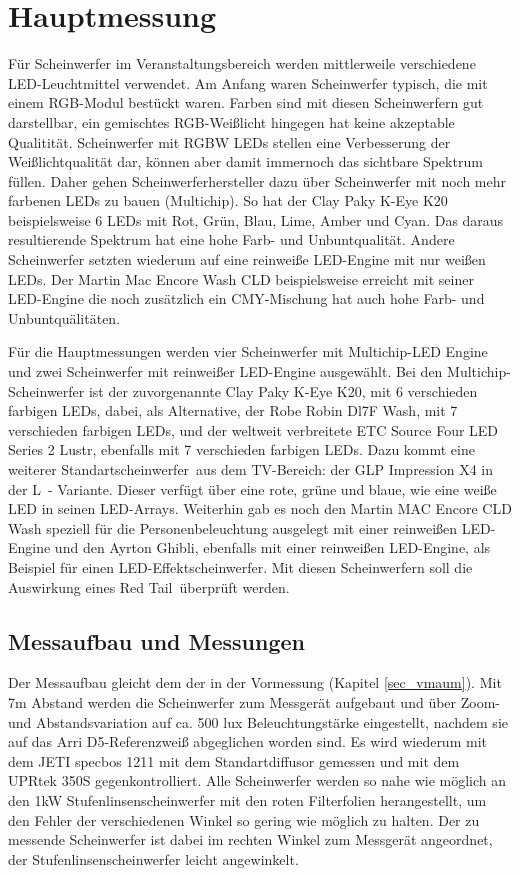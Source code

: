 \chapter{Hauptmessung}

Für Scheinwerfer im Veranstaltungsbereich werden mittlerweile verschiedene LED-Leuchtmittel verwendet. Am Anfang waren Scheinwerfer typisch, die mit einem RGB-Modul bestückt waren. Farben sind mit diesen Scheinwerfern gut darstellbar, ein gemischtes RGB-Weißlicht hingegen hat keine akzeptable Qualitität. Scheinwerfer mit RGBW LEDs stellen eine Verbesserung der Weißlichtqualität dar, können aber damit immernoch das sichtbare Spektrum füllen. Daher gehen Scheinwerferhersteller dazu über Scheinwerfer mit noch mehr farbenen LEDs zu bauen (Multichip). So hat der Clay Paky K-Eye K20 beispielsweise 6 LEDs mit Rot, Grün, Blau, Lime, Amber und Cyan. Das daraus resultierende Spektrum hat eine hohe Farb- und Unbuntqualität. Andere Scheinwerfer setzten wiederum auf eine reinweiße LED-Engine mit nur weißen LEDs. Der Martin Mac Encore Wash CLD beispielsweise erreicht mit seiner LED-Engine die noch zusätzlich ein CMY-Mischung hat auch hohe Farb- und Unbuntquälitäten.  

Für die Hauptmessungen werden vier Scheinwerfer mit Multichip-LED Engine und zwei Scheinwerfer mit reinweißer LED-Engine ausgewählt. Bei den Multichip-Scheinwerfer ist der zuvorgenannte Clay Paky K-Eye K20, mit 6 verschieden farbigen LEDs, dabei, als Alternative, der Robe Robin Dl7F Wash, mit 7 verschieden farbigen LEDs, und der weltweit verbreitete ETC Source Four LED Series 2 Lustr, ebenfalls mit 7 verschieden farbigen LEDs. Dazu kommt eine weiterer \glqq Standartscheinwerfer\grqq\ aus dem TV-Bereich: der GLP Impression X4 in der \glqq L\grqq\ - Variante. Dieser verfügt über eine rote, grüne und blaue, wie eine weiße LED in seinen LED-Arrays. Weiterhin gab es noch den Martin MAC Encore CLD Wash speziell für die Personenbeleuchtung ausgelegt mit einer reinweißen LED-Engine und den Ayrton Ghibli, ebenfalls mit einer reinweißen LED-Engine, als Beispiel für einen LED-Effektscheinwerfer. 
Mit diesen Scheinwerfern soll die Auswirkung eines \glqq Red Tail\grqq\ überprüft werden.



\section{Messaufbau und Messungen}
\label{sec_hmaufbau}
Der Messaufbau gleicht dem der in der Vormessung (Kapitel \ref{sec_vmaum}). Mit 7m Abstand werden die Scheinwerfer zum Messgerät aufgebaut und über Zoom- und Abstandsvariation auf ca. 500 lux Beleuchtungstärke eingestellt, nachdem sie auf das Arri D5-Referenzweiß abgeglichen worden sind. Es wird wiederum mit dem JETI specbos 1211 mit dem Standartdiffusor gemessen und mit dem UPRtek 350S gegenkontrolliert. Alle Scheinwerfer werden so nahe wie möglich an den 1kW Stufenlinsenscheinwerfer mit den roten Filterfolien herangestellt, um den Fehler der verschiedenen Winkel so gering wie möglich zu halten. Der zu messende Scheinwerfer ist dabei im rechten Winkel zum Messgerät angeordnet, der Stufenlinsenscheinwerfer leicht angewinkelt. 

